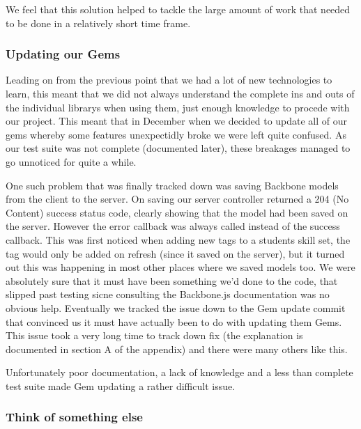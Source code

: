    We feel that this solution helped to tackle the large amount of work that needed to be done in a relatively short time frame.
  \subsubsection{Updating our Gems}
    Leading on from the previous point that we had a lot of new technologies to learn, this meant that we did not always understand the complete ins and outs of the individual librarys when using them, just enough knowledge to procede with our project. This meant that in December when we decided to update all of our gems whereby some features unexpectidly broke we were left quite confused. As our test suite was not complete (documented later), these breakages managed to go unnoticed for quite a while.

    One such problem that was finally tracked down was saving Backbone models from the client to the server. On saving our server controller returned a 204 (No Content) success status code, clearly showing that the model had been saved on the server. However the error callback was always called instead of the success callback. This was first noticed when adding new tags to a students skill set, the tag would only be added on refresh (since it saved on the server), but it turned out this was happening in most other places where we saved models too.
    We were absolutely sure that it must have been something we'd done to the code, that slipped past testing sicne consulting the Backbone.js documentation was no obvious help. Eventually we tracked the issue down to the Gem update commit that convinced us it must have actually been to do with updating them Gems.
    This issue took a very long time to track down fix (the explanation is documented in section A of the appendix) and there were many others like this.

    Unfortunately poor documentation, a lack of knowledge and a less than complete test suite made Gem updating a rather difficult issue.
  \subsubsection{Think of something else}